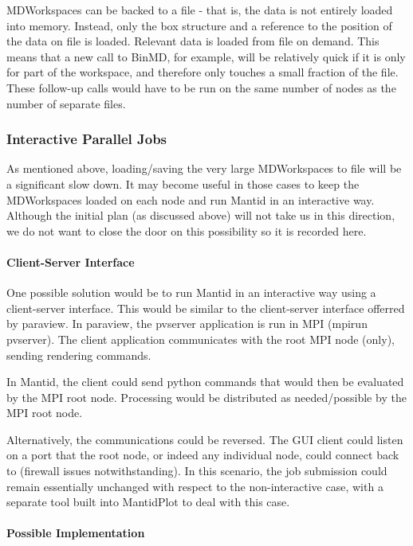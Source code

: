 MDWorkspaces can be backed to a file - that is, the data is not entirely loaded into memory. Instead, only the box structure and a reference to the position of the data on file is loaded. Relevant data is loaded from file on demand. This means that a new call to BinMD, for example, will be relatively quick if it is only for part of the workspace, and therefore only touches a small fraction of the file. These follow-up calls would have to be run on the same number of nodes as the number of separate files.

\subsubsection{Interactive Parallel Jobs}

As mentioned above, loading/saving the very large MDWorkspaces to file will be a significant slow down. It may become useful in those cases to keep the MDWorkspaces loaded on each node and run Mantid in an interactive way. Although the initial plan (as discussed above) will not take us in this direction, we do not want to close the door on this possibility so it is recorded here.

\paragraph{Client-Server Interface}

One possible solution would be to run Mantid in an interactive way using a client-server interface. This would be similar to the client-server interface offerred by paraview. In paraview, the pvserver application is run in MPI (mpirun pvserver). The client application communicates with the root MPI node (only), sending rendering commands.

In Mantid, the client could send python commands that would then be evaluated by the MPI root node. Processing would be distributed as needed/possible by the MPI root node.

Alternatively, the communications could be reversed. The GUI client could listen on a port that the root node, or indeed any individual node, could connect back to (firewall issues notwithstanding). In this scenario, the job submission could remain essentially unchanged with respect to the non-interactive case, with a separate tool built into MantidPlot to deal with this case.

\paragraph{Possible Implementation}

